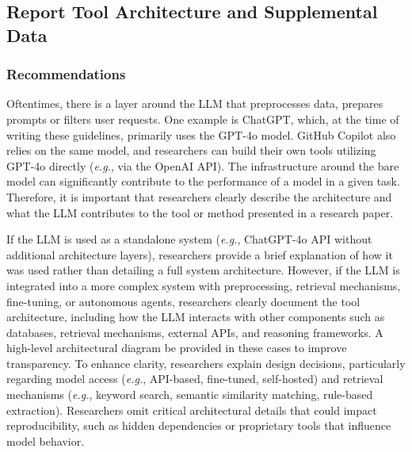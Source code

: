 



\subsection{Report Tool Architecture and Supplemental Data}

\subsubsection{Recommendations}




Oftentimes, there is a layer around the LLM that preprocesses data, prepares prompts or filters user requests. One example is ChatGPT, which, at the time of writing these guidelines, primarily uses the GPT-4o model. GitHub Copilot also relies on the same model, and researchers can build their own tools utilizing GPT-4o directly (\textit{e.g.}, via the OpenAI API). The infrastructure around the bare model can significantly contribute to the performance of a model in a given task.
Therefore, it is important that researchers clearly describe the architecture and what the LLM contributes to the tool or method presented in a research paper.


If the LLM is used as a standalone system (\textit{e.g.}, ChatGPT-4o API without additional architecture layers), researchers \should provide a brief explanation of how it was used rather than detailing a full system architecture. However, if the LLM is integrated into a more complex system with preprocessing, retrieval mechanisms, fine-tuning, or autonomous agents, researchers \must clearly document the tool architecture, including how the LLM interacts with other components such as databases, retrieval mechanisms, external APIs, and reasoning frameworks. A high-level architectural diagram \should be provided in these cases to improve transparency. To enhance clarity, researchers \should explain design decisions, particularly regarding model access (\textit{e.g.}, API-based, fine-tuned, self-hosted) and retrieval mechanisms (\textit{e.g.}, keyword search, semantic similarity matching, rule-based extraction). Researchers \mustnot omit critical architectural details that could impact reproducibility, such as hidden dependencies or proprietary tools that influence model behavior.

